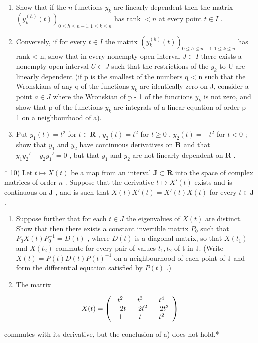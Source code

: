 \begin{enumerate}
\def\labelenumi{\alph{enumi})}
\item
  Show that if the \(n\) functions \(y_{k}\) are linearly dependent then the matrix \((y_{k}^{(h)}(t))_{0\leqslant h\leqslant n - 1, 1\leqslant k\leqslant n}\) has rank \(< n\) at every point \(t\in I\) .
\item
  Conversely, if for every \(t \in I\) the matrix \((y_{k}^{(h)}(t))_{0 \leqslant h \leqslant n-1, 1 \leqslant k \leqslant n}\) has rank \textless{} n, show that in every nonempty open interval \(J \subset I\) there exists a nonempty open interval \(U \subset J\) such that the restrictions of the \(y_{k}\) to U are linearly dependent (if p is the smallest of the numbers q \textless{} n such that the Wronskians of any q of the functions \(y_{k}\) are identically zero on J, consider a point \(a \in J\) where the Wronskian of p - 1 of the functions \(y_{k}\) is not zero, and show that p of the functions \(y_{k}\) are integrals of a linear equation of order p - 1 on a neighbourhood of a).
\item
  Put \(y_{1}(t) = t^{2}\) for \(t \in \mathbf{R}\) , \(y_{2}(t) = t^{2}\) for \(t \geqslant 0\) , \(y_{2}(t) = -t^{2}\) for \(t < 0\) ; show that \(y_{1}\) and \(y_{2}\) have continuous derivatives on \(\mathbf{R}\) and that \(y_{1}y_{2}' - y_{2}y_{1}' = 0\) , but that \(y_{1}\) and \(y_{2}\) are not linearly dependent on \(\mathbf{R}\) .
\end{enumerate}

* 10) Let \(t \mapsto X(t)\) be a map from an interval \(\mathbf{J} \subset \mathbf{R}\) into the space of complex matrices of order \(n\) . Suppose that the derivative \(t \mapsto X'(t)\) exists and is continuous on \(\mathbf{J}\) , and is such that \(X(t)X'(t) = X'(t)X(t)\) for every \(t \in \mathbf{J}\) .

\begin{enumerate}
\def\labelenumi{\alph{enumi})}
\item
  Suppose further that for each \(t \in J\) the eigenvalues of \(X(t)\) are distinct. Show that then there exists a constant invertible matrix \(P_{0}\) such that \(P_{0}X(t)P_{0}^{-1} = D(t)\) , where \(D(t)\) is a diagonal matrix, so that \(X(t_{1})\) and \(X(t_{2})\) commute for every pair of values \(t_{1}, t_{2}\) of t in J. (Write \(X(t) = P(t)D(t)P(t)^{-1}\) on a neighbourhood of each point of J and form the differential equation satisfied by \(P(t)\) .)
\item
  The matrix
\end{enumerate}

\[
X (t) = \left( \begin{array}{c c c} t ^ {2} & t ^ {3} & t ^ {4} \\ - 2 t & - 2 t ^ {2} & - 2 t ^ {3} \\ 1 & t & t ^ {2} \end{array} \right)
\]

commutes with its derivative, but the conclusion of a) does not hold.*

